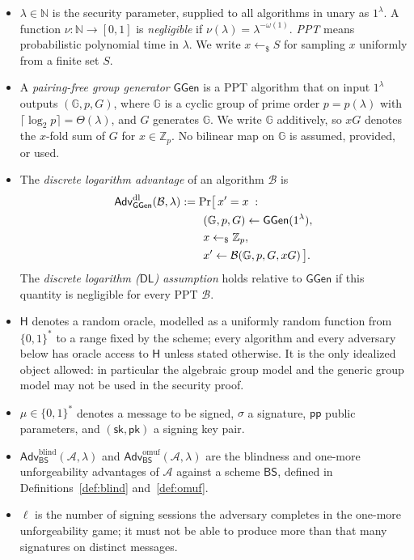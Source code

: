 \documentclass{aicr-conjecture}
\newcommand{\BS}{\mathsf{BS}}
\newcommand{\GGen}{\mathsf{GGen}}
\newcommand{\GG}{\mathbb{G}}
\newcommand{\Zp}{\mathbb{Z}_p}
\newcommand{\RO}{\mathsf{H}}
\newcommand{\pubp}{\mathsf{pp}}
\newcommand{\seck}{\mathsf{sk}}
\newcommand{\pubk}{\mathsf{pk}}
\newcommand{\Adv}{\mathsf{Adv}}
\newcommand{\DL}{\mathsf{DL}}
\newcommand{\Adl}{\Adv^{\mathrm{dl}}}
\newcommand{\Ablind}{\Adv^{\mathrm{blind}}}
\newcommand{\Aomuf}{\Adv^{\mathrm{omuf}}}
\newcommand{\rsample}{\leftarrow_{\$}}
\newcommand{\advA}{\mathcal{A}}
\newcommand{\advB}{\mathcal{B}}
\begin{document}
\begin{itemize}
  \item $\lambda \in \mathbb{N}$ is the security parameter, supplied to
  all algorithms in unary as $1^\lambda$. A function
  $\nu : \mathbb{N} \to [0,1]$ is \emph{negligible} if
  $\nu(\lambda) = \lambda^{-\omega(1)}$. \emph{PPT} means probabilistic
  polynomial time in $\lambda$. We write $x \rsample S$ for sampling $x$
  uniformly from a finite set $S$.
  \item A \emph{pairing-free group generator} $\GGen$ is a PPT algorithm
  that on input $1^\lambda$ outputs $(\GG, p, G)$, where $\GG$ is a cyclic
  group of prime order $p = p(\lambda)$ with
  $\lceil \log_2 p \rceil = \Theta(\lambda)$, and $G$ generates $\GG$. We
  write $\GG$ additively, so $xG$ denotes the $x$-fold sum of $G$ for
  $x \in \Zp$. No bilinear map on $\GG$ is assumed, provided, or used.
  \item The \emph{discrete logarithm advantage} of an algorithm $\advB$
  is
  \begin{align*}
    \Adl_{\GGen}(\advB, \lambda) &:= \Pr\bigl[\, x' = x \;:\;\\
    &\qquad (\GG, p, G) \sample \GGen(1^\lambda),\\
    &\qquad x \rsample \Zp,\\
    &\qquad x' \sample \advB(\GG, p, G, xG) \,\bigr].
  \end{align*}
  The \emph{discrete logarithm ($\DL$) assumption} holds relative to
  $\GGen$ if this quantity is negligible for every PPT $\advB$.
  \item $\RO$ denotes a random oracle, modelled as a uniformly random
  function from $\{0,1\}^*$ to a range fixed by the scheme; every
  algorithm and every adversary below has oracle access to $\RO$ unless
  stated otherwise. It is the only idealized object allowed: in
  particular the algebraic group model and the generic group model may
  not be used in the security proof.
  \item $\mu \in \{0,1\}^*$ denotes a message to be signed, $\sigma$ a
  signature, $\pubp$ public parameters, and $(\seck, \pubk)$ a signing key
  pair.
  \item $\Ablind_{\BS}(\advA, \lambda)$ and
  $\Aomuf_{\BS}(\advA, \lambda)$ are the blindness and one-more
  unforgeability advantages of $\advA$ against a scheme $\BS$, defined in
  Definitions~\ref{def:blind} and~\ref{def:omuf}.
  \item $\ell$ is the number of signing sessions the adversary completes
  in the one-more unforgeability game; it must not be able to produce more
  than that many signatures on distinct messages.
\end{itemize}
\end{document}
